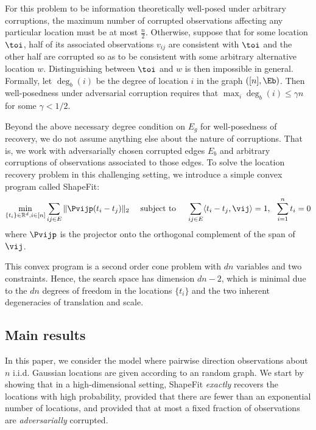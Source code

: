For this problem to be information theoretically well-posed under arbitrary corruptions, the maximum number of corrupted observations affecting any particular location must be at most $\frac{n}{2}$.  Otherwise, suppose that for some location $\toi$, half of its associated observations $v_{ij}$ are consistent with $\toi$ and the other half are corrupted so as to be consistent with some arbitrary alternative location $w$. Distinguishing between $\toi$ and $w$ is then impossible in general. Formally, let $\deg_b(i)$ be the degree of location $i$ in the graph $([n], \Eb)$. Then well-posedness under adversarial corruption requires that $\max_i \deg_b(i) \leq \gamma n$ for some $\gamma<1/2$. 

Beyond the above necessary degree condition on $E_g$ for well-posedness of recovery, we do not assume anything else about the nature of corruptions. That is, we work with adversarially chosen corrupted edges $E_b$ and arbitrary corruptions of observations associated to those edges. To solve the location recovery problem in this challenging setting, we introduce a simple convex program called ShapeFit:
\begin{align}
\min_{\{t_i\} \in \mathbb{R}^d, i \in [n]} \sum_{ij \in E} \| \Pvijp (t_i - t_j) \|_2 \quad \text{ subject to } \quad \sum_{ij \in E} \langle t_i - t_j, \vij \rangle = 1, \ \  \sum_{i=1}^n t_i = 0 \label{shapefit}
\end{align}
where $\Pvijp$ is the projector onto the orthogonal complement of the span of $\vij$.  

This convex program is a second order cone problem with $dn$ variables and two constraints.  Hence, the search space has dimension $dn-2$, which is minimal due to the $dn$ degrees of freedom in the locations $\{t_i\}$ and the two inherent degeneracies of translation and scale.


\subsection{Main results}

In this paper, we consider the model where pairwise direction observations about $n$  i.i.d. Gaussian locations are given according to an \erdosrenyi random graph.  We start by showing that in a high-dimensional setting, ShapeFit \emph{exactly} recovers the locations with high probability, provided that there are fewer than an exponential number of locations, and provided that at most a fixed fraction of observations are \emph{adversarially} corrupted.


